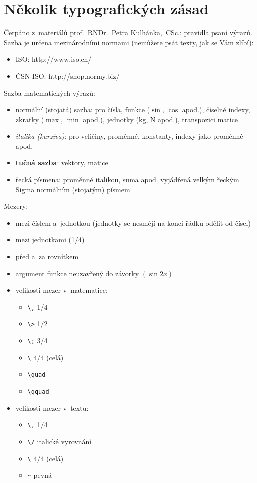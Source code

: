 \section{Několik typografických zásad}

Čerpáno z~materiálů prof.~RNDr.~Petra Kulhánka,~CSc.\?: pravidla psaní výrazů. Sazba je určena mezinárodními normami (nemůžete psát texty, jak se Vám zlíbí)\?:
\begin{itemize}
    \item ISO\?: http://www.iso.ch/
    \item ČSN ISO\?: http://shop.normy.biz/
\end{itemize}

\noindent Sazba matematických výrazů\?:
\begin{itemize}
    \item normální (stojatá) sazba\?: pro čísla, funkce ($\sin,\, \cos$ apod.), číselné indexy, zkratky ($\max,\, \min$ apod.), jednotky (kg, N apod.), transpozici matice
    \item {\em italika (kurzíva)}\?: pro veličiny, proměnné, konstanty, indexy jako proměnné apod.
    \item \textbf{tučná sazba}\?: vektory, matice
    \item řecká písmena\?: proměnné italikou, suma apod. vyjádřená velkým řeckým Sigma normálním (stojatým) písmem
\end{itemize}

\noindent Mezery\?:
\begin{itemize}
    \item mezi číslem a~jednotkou (jednotky se nesmějí na konci řádku odělit od čísel)
    \item mezi jednotkami (1/4)
    \item před a~za rovnítkem
    \item argument funkce neuzavřený do závorky $(\sin 2x)$
    \item velikosti mezer v~matematice\?:
    \begin{itemize}
        \item \verb"\," 1/4
        \item \verb"\>" 1/2
        \item \verb"\;" 3/4
        \item \verb"\"  4/4 (celá)
        \item \verb"\quad"
        \item \verb"\qquad"
    \end{itemize}
    \item velikosti mezer v~textu\?:
    \begin{itemize}
        \item \verb"\," 1/4
        \item \verb"\/" italické vyrovnání
        \item \verb"\" 4/4 (celá)
        \item \verb"~" pevná
    \end{itemize}
\end{itemize}



